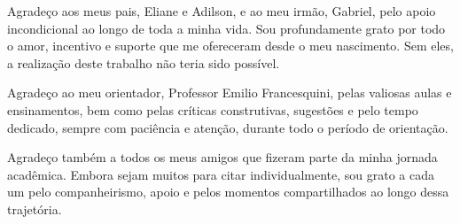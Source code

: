 \begin{agradecimentos}
Agradeço aos meus pais, Eliane e Adilson, e ao meu irmão, Gabriel, pelo apoio incondicional ao longo de toda a minha vida. Sou profundamente grato por todo o amor, incentivo e suporte que me ofereceram desde o meu nascimento. Sem eles, a realização deste trabalho não teria sido possível.

Agradeço ao meu orientador, Professor Emilio Francesquini, pelas valiosas aulas e ensinamentos, bem como pelas críticas construtivas, sugestões e pelo tempo dedicado, sempre com paciência e atenção, durante todo o período de orientação.

Agradeço também a todos os meus amigos que fizeram parte da minha jornada acadêmica. Embora sejam muitos para citar individualmente, sou grato a cada um pelo companheirismo, apoio e pelos momentos compartilhados ao longo dessa trajetória.


\end{agradecimentos}

